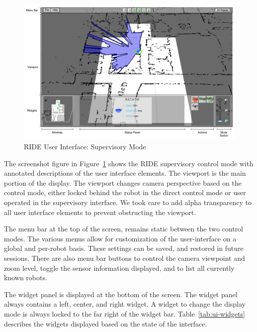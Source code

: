 \begin{figure}[ht]
\begin{center}
\includegraphics[width=6.10in]{images/ride-ui.pdf}
\caption{RIDE User Interface: Supervisory Mode\label{fig:ride-ui}}
\end{center}
\end{figure}

The screenshot figure in Figure~\ref{fig:ride-ui} shows the RIDE supervisory control mode with annotated descriptions of the user interface elements. The viewport is the main portion of the display. The viewport changes camera perspective based on the control mode, either locked behind the robot in the direct control mode or user operated in the supervisory interface. We took care to add alpha transparency to all user interface elements to prevent obstructing the viewport.

The menu bar at the top of the screen, remains static between the two control modes. The various menus allow for customization of the user-interface on a global and per-robot basis. These settings can be saved, and restored in future sessions. There are also menu bar buttons to control the camera viewpoint and zoom level, toggle the sensor information displayed, and to list all currently known robots.

The widget panel is displayed at the bottom of the screen. The widget panel always contains a left, center, and right widget. A widget to change the display mode is always locked to the far right of the widget bar. Table~\ref{tab:ui-widgets} describes the widgets displayed based on the state of the interface.

